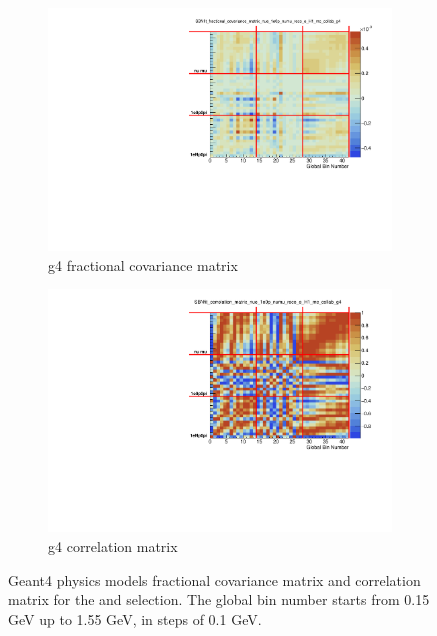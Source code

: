 \begin{figure}[ht] 
\begin{center}
    \begin{subfigure}[b]{0.48\textwidth}
    \centering
    \includegraphics[width=1.00\textwidth]{Systematics/CovarianceMatrices/SBNfit_fractional_covariance_matrix_nue_1e0p_numu_reco_e_H1_mc_collab_g4_collapsed.pdf}
    \caption{g4 fractional covariance matrix}
    \end{subfigure}
    \begin{subfigure}[b]{0.48\textwidth}
    \centering
    \includegraphics[width=1.00\textwidth]{Systematics/CovarianceMatrices/SBNfit_correlation_matrix_nue_1e0p_numu_reco_e_H1_mc_collab_g4_collapsed.pdf}
    \caption{g4 correlation matrix}
    \end{subfigure}
\caption{\label{fig:g4matrices} Geant4 physics models fractional covariance matrix and correlation matrix for the \npsel and \zpsel selection. The global bin number starts from 0.15 GeV up to 1.55 GeV, in steps of 0.1 GeV.}
\end{center}
\end{figure}

